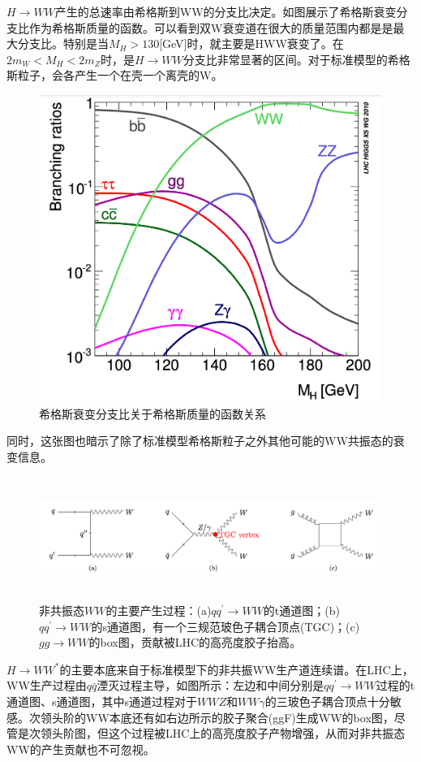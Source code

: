 $H\to WW$产⽣的总速率由希格斯到WW的分⽀⽐决定。如图展示了希格斯衰变分支比作为希格斯质量的函数。可以看到双W衰变道在很大的质量范围内都是是最大分支比。特别是当$M_H>130$[GeV]时，就主要是HWW衰变了。在$2m_W<M_H<2m_Z$时，是$H\to WW$分支比非常显著的区间。对于标准模型的希格斯粒子，会各产生一个在壳一个离壳的W。
\begin{figure}[H]
 \centering
 \includegraphics[height=10cm, width=12cm]{pictures/XS-MH.png}
  \caption{希格斯衰变分支比关于希格斯质量的函数关系}
 \label{fig:2.5}
\end{figure}
同时，这张图也暗示了除了标准模型希格斯粒子之外其他可能的WW共振态的衰变信息。

\begin{figure}[H]
 \centering
 \includegraphics[height=4cm, width=16cm]{pictures/WW_bkg.png}
  \caption{非共振态$WW$的主要产生过程：(a)$qq^\prime\to WW$的t通道图；(b)$qq^\prime\to WW$的s通道图，有一个三规范玻色子耦合顶点(TGC)；(c)$gg\to WW$的box图，贡献被LHC的高亮度胶子抬高。}
 \label{fig:2.6}
\end{figure}

$H\to WW^*$的主要本底来自于标准模型下的非共振WW生产道连续谱。在LHC上，WW生产过程由$q\bar{q}$湮灭过程主导，如图所示：左边和中间分别是$qq^\prime\to WW$过程的t通道图、s通道图，其中s通道过程对于$WWZ$和$WW\gamma$的三玻色子耦合顶点十分敏感。次领头阶的WW本底还有如右边所示的胶子聚合(ggF)生成WW的box图，尽管是次领头阶图，但这个过程被LHC上的高亮度胶子产物增强，从而对非共振态WW的产生贡献也不可忽视。

